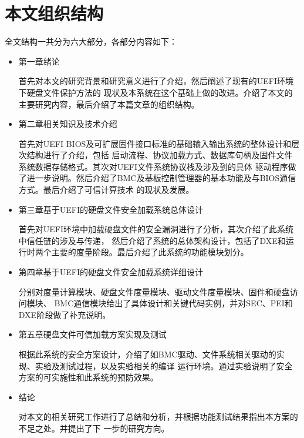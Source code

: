 %
%
\section{本文组织结构}
全文结构一共分为六大部分，各部分内容如下：
\begin{itemize}
\item 第一章\quad 绪论
\par 首先对本文的研究背景和研究意义进行了介绍，然后阐述了现有的UEFI环境下硬盘文件保护方法的
现状及本系统在这个基础上做的改进。介绍了本文的主要研究内容，最后介绍了本篇文章的组织结构。
\item 第二章\quad 相关知识及技术介绍
\par 首先对UEFI BIOS及可扩展固件接口标准的基础输入输出系统的整体设计和层次结构进行了介绍，包括
启动流程、协议加载方式、数据库句柄及固件文件系统数据存储格式。其次对UEFI文件系统协议栈及涉及到的具体
驱动程序做了进一步说明。然后介绍了BMC及基板控制管理器的基本功能及与BIOS通信方式。最后介绍了可信计算技术
的现状及发展。
\item 第三章\quad 基于UEFI的硬盘文件安全加载系统总体设计
\par 首先对UEFI环境中加载硬盘文件的安全漏洞进行了分析，其次介绍了此系统中信任链的涉及与传递，
然后介绍了系统的总体架构设计，包括了DXE和运行时两个主要的度量阶段。最后介绍了此系统的功能模块划分。
\item 第四章\quad 基于UEFI的硬盘文件安全加载系统详细设计
\par 分别对度量计算模块、硬盘文件度量模块、驱动文件度量模块、固件和硬盘访问模块、
BMC通信模块给出了具体设计和关键代码实例，并对SEC、PEI和DXE阶段做了补充说明。
\item 第五章\quad 硬盘文件可信加载方案实现及测试
\par 根据此系统的安全方案设计，介绍了如BMC驱动、文件系统相关驱动的实现、实验及测试过程，以及实验相关的编译
运行环境。通过实验说明了安全方案的可实施性和此系统的预防效果。
\item 结论
\par 对本文的相关研究工作进行了总结和分析，并根据功能测试结果指出本方案的不足之处。并提出了下
一步的研究方向。
\end{itemize}
